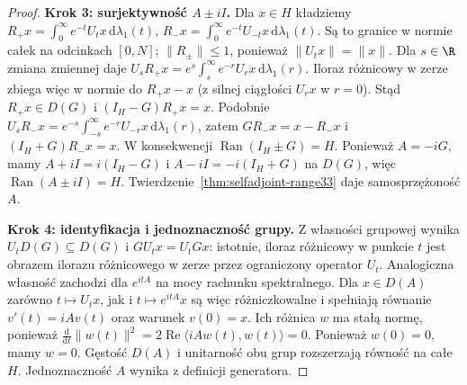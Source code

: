 \begin{proof}
\textbf{Krok 3: surjektywność $A\pm iI$.}
Dla $x\in H$ kładziemy
$R_+x=\int_0^\infty e^{-t}U_tx\,\mathrm d\lambda_1(t)$,
$R_-x=\int_0^\infty e^{-t}U_{-t}x\,\mathrm d\lambda_1(t)$.
Są to granice w normie całek na odcinkach $[0,N]$;
$\|R_\pm\|\le1$, ponieważ $\|U_tx\|=\|x\|$.
Dla $s\in\R$ zmiana zmiennej daje
$U_sR_+x=e^s\int_s^\infty e^{-r}U_rx\,\mathrm d\lambda_1(r)$.
Iloraz różnicowy w zerze zbiega więc w normie do
$R_+x-x$ (z silnej ciągłości $U_rx$ w $r=0$).
Stąd $R_+x\in D(G)$ i $(I_H-G)R_+x=x$.
Podobnie
$U_sR_-x=e^{-s}\int_{-s}^\infty e^{-r}U_{-r}x\,\mathrm d\lambda_1(r)$,
zatem $GR_-x=x-R_-x$ i $(I_H+G)R_-x=x$.
W konsekwencji
$\operatorname{Ran}(I_H\pm G)=H$. Ponieważ $A=-iG$,
mamy $A+iI=i(I_H-G)$ i $A-iI=-i(I_H+G)$ na $D(G)$,
więc $\operatorname{Ran}(A\pm iI)=H$.
Twierdzenie~\ref{thm:selfadjoint-range33} daje samosprzężoność $A$.

\textbf{Krok 4: identyfikacja i jednoznaczność grupy.}
Z własności grupowej wynika
$U_tD(G)\subseteq D(G)$ i $GU_tx=U_tGx$:
istotnie, iloraz różnicowy w punkcie $t$ jest obrazem
ilorazu różnicowego w zerze przez ograniczony operator $U_t$.
Analogiczna własność zachodzi dla $e^{itA}$
na mocy rachunku spektralnego.
Dla $x\in D(A)$ zarówno $t\mapsto U_tx$, jak i
$t\mapsto e^{itA}x$ są więc różniczkowalne i spełniają
równanie $v'(t)=iAv(t)$ oraz warunek $v(0)=x$.
Ich różnica $w$ ma stałą normę, ponieważ
$\frac{\mathrm d}{\mathrm dt}\|w(t)\|^2
=2\operatorname{Re}\langle iAw(t),w(t)\rangle=0$.
Ponieważ $w(0)=0$, mamy $w=0$.
Gęstość $D(A)$ i unitarność obu grup rozszerzają równość
na całe $H$. Jednoznaczność $A$ wynika z definicji generatora.
\end{proof}
\endgroup
